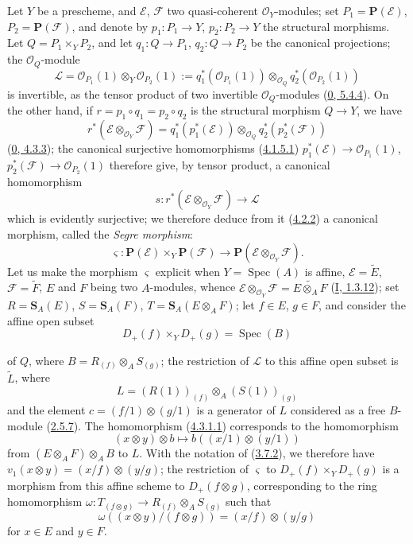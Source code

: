 \begin{env}[4.3.1]
\label{II.4.3.1}
Let $Y$ be a prescheme, and $\mathcal{E}$, $\mathcal{F}$ two quasi-coherent
$\mathcal{O}_Y$-modules; set
$P_1=\mathbf{P}(\mathcal{E})$, $P_2=\mathbf{P}(\mathcal{F})$, and denote
by $p_1:P_1\to Y$, $p_2:P_2\to Y$ the structural morphisms. Let
$Q=P_1\times_YP_2$, and let $q_1:Q\to P_1$, $q_2:Q\to P_2$ be the
canonical projections; the $\mathcal{O}_Q$-module
\[
  \mathcal{L}=\mathcal{O}_{P_1}(1)\otimes_Y\mathcal{O}_{P_2}(1)
  :=q_1^*(\mathcal{O}_{P_1}(1))\otimes_{\mathcal{O}_Q}
  q_2^*(\mathcal{O}_{P_2}(1))
\]
is invertible, as the tensor product of two invertible
$\mathcal{O}_Q$-modules (\hyperref[0.5.4.4]{0, 5.4.4}). On the other hand, if
$r=p_1\circ q_1=p_2\circ q_2$ is the structural morphism $Q\to Y$, we have
\[
  r^*(\mathcal{E}\otimes_{\mathcal{O}_Y}\mathcal{F})
  =q_1^*(p_1^*(\mathcal{E}))\otimes_{\mathcal{O}_Q}
  q_2^*(p_2^*(\mathcal{F}))
\]
(\hyperref[0.4.3.3]{0, 4.3.3}); the canonical surjective homomorphisms
(\hyperref[II.4.1.5.1]{4.1.5.1})
$p_1^*(\mathcal{E})\to\mathcal{O}_{P_1}(1)$,
$p_2^*(\mathcal{F})\to\mathcal{O}_{P_2}(1)$ therefore give, by tensor
product, a canonical homomorphism
\[
\label{II.4.3.1.1}
  s:r^*(\mathcal{E}\otimes_{\mathcal{O}_Y}\mathcal{F})\longrightarrow
  \mathcal{L}
\tag{4.3.1.1}
\]
which is evidently surjective; we therefore deduce from it
(\hyperref[II.4.2.2]{4.2.2}) a canonical morphism, called the
\emph{Segre morphism}:
\[
\label{II.4.3.1.2}
  \varsigma:\mathbf{P}(\mathcal{E})\times_Y\mathbf{P}(\mathcal{F})
  \longrightarrow
  \mathbf{P}(\mathcal{E}\otimes_{\mathcal{O}_Y}\mathcal{F}).
\tag{4.3.1.2}
\]
Let us make the morphism $\varsigma$ explicit when $Y=\operatorname{Spec}(A)$ is
affine, $\mathcal{E}=\widetilde{E}$, $\mathcal{F}=\widetilde{F}$, $E$ and $F$
being two $A$-modules, whence
$\mathcal{E}\otimes_{\mathcal{O}_Y}\mathcal{F}=\widetilde{E\otimes_A F}$
(\hyperref[I.1.3.12]{I, 1.3.12}); set
$R=\mathbf{S}_A(E)$, $S=\mathbf{S}_A(F)$,
$T=\mathbf{S}_A(E\otimes_A F)$; let $f\in E$, $g\in F$, and consider
the affine open subset
\[
  D_+(f)\times_YD_+(g)=\operatorname{Spec}(B)
\]


of $Q$, where $B=R_{(f)}\otimes_AS_{(g)}$; the restriction of $\mathcal{L}$ to
this affine open subset is $\widetilde{L}$, where
\[
  L=(R(1))_{(f)}\otimes_A(S(1))_{(g)}
\]
and the element $c=(f/1)\otimes(g/1)$ is a generator of $L$ considered as a
free $B$-module (\hyperref[II.2.5.7]{2.5.7}). The homomorphism
(\hyperref[II.4.3.1.1]{4.3.1.1}) corresponds to the homomorphism
\[
  (x\otimes y)\otimes b\longmapsto b((x/1)\otimes(y/1))
\]
from $(E\otimes_A F)\otimes_AB$ to $L$. With the notation of
(\hyperref[II.3.7.2]{3.7.2}), we therefore have
$v_1(x\otimes y)=(x/f)\otimes(y/g)$; the restriction of $\varsigma$ to
$D_+(f)\times_YD_+(g)$ is a morphism from this affine scheme to
$D_+(f\otimes g)$, corresponding to the ring homomorphism
$\omega:T_{(f\otimes g)}\to R_{(f)}\otimes_AS_{(g)}$ such that
\[
\label{II.4.3.1.3}
  \omega((x\otimes y)/(f\otimes g))=(x/f)\otimes(y/g)
\tag{4.3.1.3}
\]
for $x\in E$ and $y\in F$.
\end{env}

